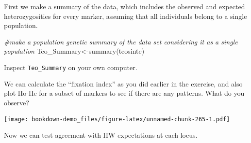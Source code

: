 \documentclass[
]{book}
\newenvironment{Shaded}{\begin{snugshade}}{\end{snugshade}}
\newcommand{\AttributeTok}[1]{\textcolor[rgb]{0.77,0.63,0.00}{#1}}
\newcommand{\CommentTok}[1]{\textcolor[rgb]{0.56,0.35,0.01}{\textit{#1}}}
\newcommand{\DecValTok}[1]{\textcolor[rgb]{0.00,0.00,0.81}{#1}}
\newcommand{\FunctionTok}[1]{\textcolor[rgb]{0.00,0.00,0.00}{#1}}
\newcommand{\NormalTok}[1]{#1}
\newcommand{\OtherTok}[1]{\textcolor[rgb]{0.56,0.35,0.01}{#1}}
\newcommand{\SpecialCharTok}[1]{\textcolor[rgb]{0.00,0.00,0.00}{#1}}
\newcommand{\StringTok}[1]{\textcolor[rgb]{0.31,0.60,0.02}{#1}}
\begin{document}
First we make a summary of the data, which includes the observed and expected heterozygosities for every marker, assuming that all individuals belong to a single population.

\begin{Shaded}
\begin{Highlighting}[]
\CommentTok{\#make a population genetic summary of the data set considering it as a single population}
\NormalTok{Teo\_Summary}\OtherTok{\textless{}{-}}\FunctionTok{summary}\NormalTok{(teosinte)}
\end{Highlighting}
\end{Shaded}

Inspect \texttt{Teo\_Summary} on your own computer.

We can calculate the ``fixation index'' as you did earlier in the exercise, and also plot Ho-He for a subset of markers to see if there are any patterns. What do you observe?

\begin{Shaded}
\end{Shaded}

\texttt{[image: bookdown-demo\_files/figure-latex/unnamed-chunk-265-1.pdf]}

\begin{Shaded}
\end{Shaded}

Now we can test agreement with HW expectations at each locus.
\end{document}
